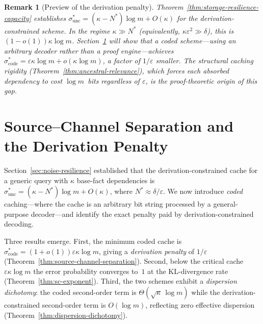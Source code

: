 \documentclass[journal]{IEEEtran}
\newtheorem{remark}{Remark}[section]
\numberwithin{equation}{section}
\begin{document}
\begin{remark}[Preview of the derivation penalty]
\label{rem:ct4-preview-penalty}
Theorem~\ref{thm:storage-resilience-capacity} establishes
$\sigma^*_{\mathrm{unc}}=(\kappa{-}N^*)\log m+O(\kappa)$
for the derivation-constrained scheme.
In the regime $\kappa\gg N^*$
\textup{(}equivalently, $\kappa\varepsilon^2\gg\delta$\textup{)},
this is $(1{-}o(1))\kappa\log m$.
Section~\ref{sec:precise} will show that a coded scheme---using
an arbitrary decoder rather than a proof engine---achieves
$\sigma^*_{\mathrm{code}}=\varepsilon\kappa\log m+o(\kappa\log m)$,
a factor of $1/\varepsilon$ smaller.
The structural caching rigidity
(Theorem~\ref{thm:ancestral-relevance}), which forces each
absorbed dependency to cost $\log m$~bits regardless of
$\varepsilon$, is the proof-theoretic origin of this gap.
\end{remark}


\section{Source--Channel Separation and the Derivation Penalty}
\label{sec:precise}%

Section~\ref{sec:noise-resilience} established that the
derivation-constrained cache for a generic query with $\kappa$
base-fact dependencies is
$\sigma^*_{\mathrm{unc}}=(\kappa{-}N^*)\log m+O(\kappa)$,
where $N^*\approx\delta/\varepsilon$.
We now introduce \emph{coded} caching---where the cache is an
arbitrary bit string processed by a general-purpose decoder---and
identify the exact penalty paid by derivation-constrained
decoding.

Three results emerge.
First, the minimum coded cache is
$\sigma^*_{\mathrm{code}}
=(1{+}o(1))\varepsilon\kappa\log m$,
giving a \emph{derivation penalty} of $1/\varepsilon$
(Theorem~\ref{thm:source-channel-separation}).
Second, below the critical cache $\varepsilon\kappa\log m$ the
error probability converges to~$1$ at the KL-divergence rate
(Theorem~\ref{thm:sc-exponent}).
Third, the two schemes exhibit a \emph{dispersion dichotomy}:
the coded second-order term is
$\Theta(\sqrt\kappa\,\log m)$ while the
derivation-constrained second-order term is $O(\log m)$,
reflecting zero effective dispersion
(Theorem~\ref{thm:dispersion-dichotomy}).
\end{document}
